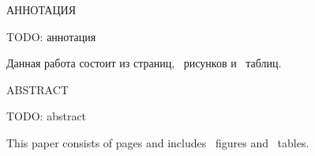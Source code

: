 \begin{center}
	АННОТАЦИЯ
\end{center}

TODO: аннотация

Данная работа состоит из \pageref{LastPage} страниц, \totalfigures ~рисунков и \totaltables ~таблиц.

\begin{center}
	ABSTRACT
\end{center}

TODO: abstract

This paper consists of \pageref{LastPage} pages and includes \totalfigures ~figures and \totaltables ~tables.
